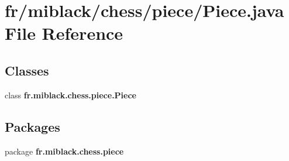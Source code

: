 \section{fr/miblack/chess/piece/\-Piece.java File Reference}
\label{Piece_8java}
\subsection*{Classes}
\begin{DoxyCompactItemize}
\item 
class {\bf fr.\-miblack.\-chess.\-piece.\-Piece}
\end{DoxyCompactItemize}
\subsection*{Packages}
\begin{DoxyCompactItemize}
\item 
package {\bf fr.\-miblack.\-chess.\-piece}
\end{DoxyCompactItemize}
